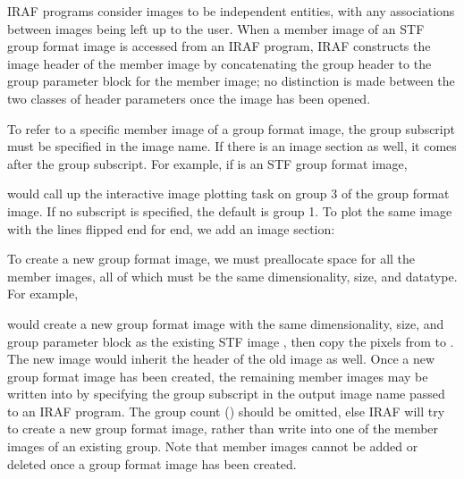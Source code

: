 IRAF programs consider images to be independent entities, with any associations
between images being left up to the user.  When a member image of an STF
group format image is accessed from an IRAF program, IRAF constructs the image
header of the member image by concatenating the group header to the group
parameter block for the member image; no distinction is made between the two
classes of header parameters once the image has been opened.

To refer to a specific member image of a group format image, the group
subscript must be specified in the image name.  If there is an image section
as well, it comes after the group subscript.  For example, if 
is an STF group format image,

\begin{quotation}\noindent
{} 
\end{quotation}

\noindent
would call up the interactive image plotting task  on group
3 of the group format image.  If no subscript is specified, the default is
group 1.  To plot the same image with the lines flipped end for end, we add
an image section:

\begin{quotation}\noindent
{} 
\end{quotation}

\noindent
To create a new group format image, we must preallocate space for all the
member images, all of which must be the same dimensionality, size, and
datatype.  For example,

\begin{quotation}\noindent
{} 
\end{quotation}

\noindent
would create a new group format image  with the same
dimensionality, size, and group parameter block as the existing STF image
, then copy the pixels from  to
.  The new image would inherit the header of the old
image as well.  Once a new group format image has been created, the remaining
member images may be written into by specifying the group subscript in the
output image name passed to an IRAF program.  The group count
() should be omitted, else IRAF will try to create a new
group format image, rather than write into one of the member images of
an existing group.  Note that member images cannot be added or deleted
once a group format image has been created.

